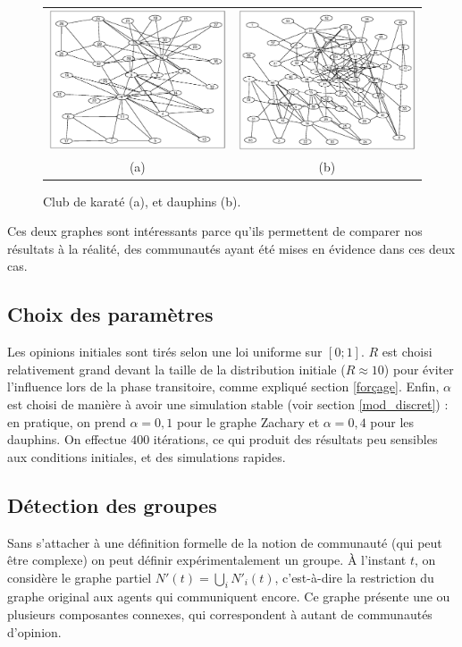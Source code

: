 \documentclass[12pt]{article}
\begin{document}
\begin{figure}[htb]
	\begin{center}
		\begin{tabular}[h]{cc}
			\includegraphics[width=.4\textwidth]{zachary} &
			\includegraphics[width=.4\textwidth]{dolphins}
			\vspace{-5mm}
			\\
			(a) & (b)
		\end{tabular}
	\end{center}
	\caption{Club de karaté (a), et dauphins (b).}
	\label{exemples_graphes}
\end{figure}

Ces deux graphes sont intéressants parce qu'ils permettent de comparer
nos résultats à la réalité, des communautés ayant été mises en
évidence dans ces deux cas.

\subsection{Choix des paramètres}
Les opinions initiales sont tirés selon une loi uniforme sur $[0; 1]$.
$R$ est choisi relativement grand devant la taille de la distribution
initiale ($R\approx10$) pour éviter l'influence lors de la phase
transitoire, comme expliqué section \ref{forçage}. Enfin, $\alpha$ est
choisi de manière à avoir une simulation stable (voir section
\ref{mod_discret}) : en pratique, on prend $\alpha = 0,1$ pour le
graphe Zachary et $\alpha = 0,4$ pour les dauphins. On effectue $400$
itérations, ce qui produit des résultats peu sensibles aux conditions
initiales, et des simulations rapides.

\subsection{Détection des groupes}
Sans s'attacher à une définition formelle de la notion de communauté
(qui peut être complexe) on peut définir expérimentalement un
groupe. À l'instant $t$, on considère le graphe partiel $N'(t) =
\bigcup_i N'_i(t)$, c'est-à-dire la restriction du graphe original aux
agents qui communiquent encore. Ce graphe présente une ou plusieurs
composantes connexes, qui correspondent à autant de communautés
d'opinion.
\end{document}
